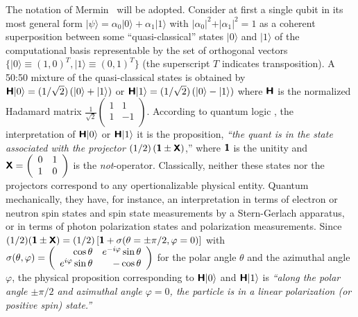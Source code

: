 The notation of Mermin~\cite{mermin-02,mermin-04,mermin-qc} will be adopted.
Consider at first a single qubit in its most general form
$
\vert \psi \rangle
=
\alpha_0
\vert 0 \rangle
+
\alpha_1
\vert 1 \rangle
$
with
$
\vert
\alpha_0
\vert^2
+
\vert
\alpha_1
\vert^2
=1$
as a coherent superposition
between some ``quasi-classical''
states
$
\vert 0 \rangle
$ and
$
\vert 1 \rangle
$
of the computational basis representable by the set of orthogonal vectors
$\{\vert 0 \rangle \equiv (1,0)^T,\vert 1 \rangle \equiv (0,1)^T\}$
(the superscript $T$ indicates transposition).
A 50:50 mixture of the quasi-classical states
is obtained by
$\textsf{\textbf{H}} \vert 0 \rangle
=
(1/\sqrt{2})\left(
\vert 0 \rangle
+
\vert 1 \rangle
\right)
$ or $\textsf{\textbf{H}} \vert 1 \rangle
=
(1/\sqrt{2})\left(
\vert 0 \rangle
-
\vert 1 \rangle
\right)
$
where $\textsf{\textbf{H}}$ is the normalized Hadamard matrix
$\frac{1}{\sqrt{2}}\left(
\begin{array}{rr}
1&1\\
1&-1\\
\end{array}
\right)$.
According to quantum logic
\cite{birkhoff-36,v-neumann-55,svozil-ql},
the interpretation of
$
\textsf{\textbf{H}} \vert 0 \rangle
$
or
$
\textsf{\textbf{H}} \vert 1 \rangle
$
it is the proposition,
{\em ``the quant is in the state associated with the projector}
$(1/2)\left(\textsf{\textbf{1}} \pm \textsf{\textbf{X}}\right)$,''
where $\textsf{\textbf{1}}$ is the unitity and $\textsf{\textbf{X}}
=
\left(
\begin{array}{rr}
0&1\\
1&0\\
\end{array}
\right)$ is the {\em not}-operator.
Classically, neither these states nor the projectors correspond to any
opertionalizable physical entity.
Quantum mechanically, they have,
for instance, an interpretation in terms of electron or neutron spin states
and spin state measurements by a Stern-Gerlach apparatus,
or in terms of photon polarization states and polarization measurements.
Since
$(1/2)(\textsf{\textbf{1}} \pm  \textsf{\textbf{X}})=
(1/2)\left[\textsf{\textbf{1}} + {\bf \sigma}( \theta =\pm \pi /2,\varphi=0)\right]$
with
$
{\bf \sigma}( \theta ,\varphi )=
\left(
\begin{array}{rr} \cos \theta  &e^{-i\varphi} \sin \theta   \\
  e^{i\varphi}\sin \theta  & -\cos \theta
  \end{array}
\right)
$
for the polar angle $\theta$ and the azimuthal angle $\varphi$,
the physical proposition  corresponding to
$\textsf{\textbf{H}}\vert 0\rangle$ and
$\textsf{\textbf{H}}\vert 1\rangle$ is
{\em ``along the polar angle $\pm \pi/2$ and azimuthal angle $\varphi=0$,
the particle is in a linear polarization (or positive spin) state.''}


